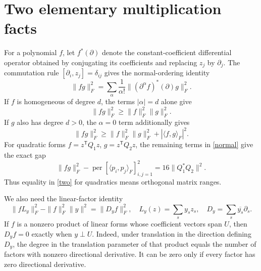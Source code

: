 \documentclass[11pt]{article}
\newcommand{\per}{\operatorname{per}}
\begin{document}
\section{Two elementary multiplication facts}
For a polynomial $f$, let $f^*(\partial)$ denote the constant-coefficient
differential operator obtained by conjugating its coefficients and replacing
$z_j$ by $\partial_j$. The commutation rule
$[\partial_i,z_j]=\delta_{ij}$ gives the normal-ordering identity
\begin{equation}\label{normal}
 \|fg\|_F^2=\sum_\alpha\frac1{\alpha!}
       \| (\partial^\alpha f)^*(\partial)g\|_F^2.
\end{equation}
If $f$ is homogeneous of degree $d$, the terms $|\alpha|=d$ alone give
\begin{equation}\label{bombieri}
 \|fg\|_F^2\geq\|f\|_F^2\|g\|_F^2.
\end{equation}
If $g$ also has degree $d>0$, the $\alpha=0$ term additionally gives
\begin{equation}\label{two}
 \|fg\|_F^2\geq\|f\|_F^2\|g\|_F^2+|\langle f,g\rangle_F|^2.
\end{equation}
For quadratic forms $f=z^{\mathsf T}Q_1z$, $g=z^{\mathsf T}Q_2z$, the
remaining terms in \eqref{normal} give the exact gap
\begin{equation}\label{twogap}
 \|fg\|_F^2-\per[\langle p_i,p_j\rangle_F]_{i,j=1}^2
       =16\|Q_1^*Q_2\|^2.
\end{equation}
Thus equality in \eqref{two} for quadratics means orthogonal matrix ranges.

We also need the linear-factor identity
\begin{equation}\label{linear}
 \|fL_y\|_F^2-\|f\|_F^2\|y\|^2=\|D_y f\|_F^2,
 \quad L_y(z)=\sum_s y_s z_s,\quad D_y=\sum_s\overline{y_s}\partial_s.
\end{equation}
If $f$ is a nonzero product of linear forms whose coefficient vectors span
$U$, then $D_y f=0$ exactly when $y\perp U$. Indeed, under translation in
the direction defining $D_y$, the degree in the translation parameter of
that product equals the number of factors with nonzero directional derivative.
It can be zero only if every factor has zero directional derivative.
\end{document}
